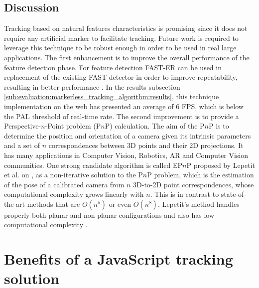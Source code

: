 \newpage



\subsection{Discussion} %
\label{sub:evaluation:markerless_tracking_algorithm:discussion}

Tracking based on natural features characteristics is promising since it does not require any artificial marker to facilitate tracking. Future work is required to leverage this technique to be robust enough in order to be used in real large applications. The first enhancement is to improve the overall performance of the feature detection phase. For feature detection FAST-ER can be used in replacement of the existing FAST detector in order to improve repeatability, resulting in better performance \cite{RostenFaster2010}. In the results subsection \ref{sub:evaluation:markerless_tracking_algorithm:results}, this technique implementation on the web has presented an average of 6 FPS, which is below the PAL threshold of real-time rate. The second improvement is to provide a Perspective-$n$-Point problem (P$n$P) calculation. The aim of the P$n$P is to determine the position and orientation of a camera given its intrinsic parameters and a set of $n$ correspondences between 3D points and their 2D projections. It has many applications in Computer Vision, Robotics, AR and Computer Vision \cite{Hartley2004} communities. One strong candidate algorithm is called EP$n$P proposed by Lepetit et al. on \cite{Lepetit2008}, as a non-iterative solution to the P$n$P problem, which is the estimation of the pose of a calibrated camera from $n$ 3D-to-2D point correspondences, whose computational complexity grows linearly with $n$. This is in contrast to state-of-the-art methods that are $O(n^5)$ or even $O(n^8)$. Lepetit's method handles properly both planar and non-planar configurations and also has low computational complexity \cite{Lepetit2008}.



\section{Benefits of a JavaScript tracking solution} %
\label{sec:evaluation:js_tracking_solution}

